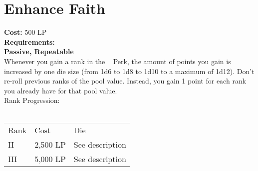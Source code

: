 \section{Enhance Faith}\label{sec:enhanceFaith}
\textbf{Cost:} 500 LP\\
\textbf{Requirements:} -\\
\textbf{Passive, Repeatable}\\
Whenever you gain a rank in the ~ Perk, the amount of points you gain is increased by one die size (from 1d6 to 1d8 to 1d10 to a maximum of 1d12).
Don't re-roll previous ranks of the pool value.
Instead, you gain 1 point for each rank you already have for that pool value.
\\
Rank Progression:\\
\\
\begin{tabular}{l | l | p{12cm} }
    Rank & Cost & Die\\
    II & 2,500 LP & See description \\
    III & 5,000 LP & See description \\
\end{tabular}